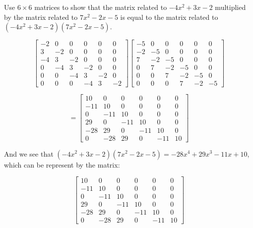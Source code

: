 \begin{example}{}
Use $6 \times 6$ matrices to show that the matrix related to $-4x^2 + 3x - 2$ multiplied by the matrix related to $7x^2 - 2x - 5$ is equal to the matrix related to $(-4x^2 + 3x - 2 )(7x^2 - 2x - 5)$.

\[\left[\begin{array}{cccccc}-2 & 0 & 0 & 0 & 0 & 0\\3 & -2 & 0 & 0 & 0 & 0\\-4 & 3 & -2 & 0 & 0 & 0\\0 & -4 & 3 & -2 & 0 & 0\\0 & 0 & -4 & 3 & -2 & 0\\0 & 0 & 0 & -4 & 3 & -2\end{array}\right]\left[\begin{array}{cccccc}-5 & 0 & 0 & 0 & 0 & 0\\-2 & -5 & 0 & 0 & 0 & 0\\7 & -2 & -5 & 0 & 0 & 0\\0 & 7 & -2 & -5 & 0 & 0\\0 & 0 & 7 & -2 & -5 & 0\\0 & 0 & 0 & 7 & -2 & -5\end{array}\right]\]

\[= \left[\begin{array}{cccccc}10 & 0 & 0 & 0 & 0 & 0\\-11 & 10 & 0 & 0 & 0 & 0\\0 & -11 & 10 & 0 & 0 & 0\\29 & 0 & -11 & 10 & 0 & 0\\-28 & 29 & 0 & -11 & 10 & 0\\0 & -28 & 29 & 0 & -11 & 10\end{array}\right]\]

And we see that $(-4x^2 + 3x - 2 )(7x^2 - 2x - 5) =  -28x^4 + 29 x^3 - 11x + 10$, which can be represent by the matrix:

\[\left[\begin{array}{cccccc}10 & 0 & 0 & 0 & 0 & 0\\-11 & 10 & 0 & 0 & 0 & 0\\0 & -11 & 10 & 0 & 0 & 0\\29 & 0 & -11 & 10 & 0 & 0\\-28 & 29 & 0 & -11 & 10 & 0\\0 & -28 & 29 & 0 & -11 & 10\end{array}\right]\]
\end{example}
